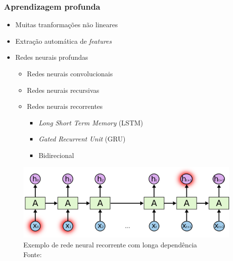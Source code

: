 \documentclass[10pt]{beamer}
\begin{document}
\begin{frame}[fragile]
  \frametitle{Aprendizagem profunda}

   \begin{itemize}
    \item Muitas tranformações não lineares

    \item Extração automática de \textit{features}
    
    \item Redes neurais profundas

    \begin{itemize}
      \item[-] Redes neurais convolucionais
      \item[-] Redes neurais recursivas
      \item[-] Redes neurais recorrentes
        \begin{itemize}
          \item[\ ] \textit{Long Short Term Memory} (LSTM)
          \item[\ ] \textit{Gated Recurrent Unit} (GRU) 
          \item[\ ] Bidirecional
        \end{itemize}
    \end{itemize}

  \end{itemize}

  \begin{figure}[b]
    \begin{center}
        \includegraphics[scale=0.25]{img/rnn_longtermdependencies.png}
    \end{center}
    \caption{Exemplo de rede neural recorrente com longa dependência\\Fonte: }

  \end{figure}
  

\end{frame}
\end{document}
